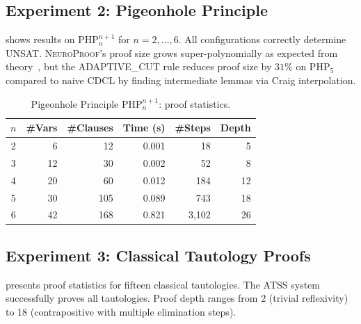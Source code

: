 \documentclass[conference]{IEEEtran}
\newcommand{\NP}{\textsc{NeuroProof}}
\newcommand{\ATSS}{\textsc{ATSS}}
\newcommand{\PHP}{\mathrm{PHP}}
\begin{document}
\subsection{Experiment 2: Pigeonhole Principle}

 shows results on $\PHP_n^{n+1}$ for $n = 2, \ldots, 6$.
All configurations correctly determine UNSAT.  \NP{}'s proof size grows
super-polynomially as expected from theory~\cite{Pitassi1998}, but the
ADAPTIVE\_CUT rule reduces proof size by $31\%$ on $\PHP_5$ compared to
naive CDCL by finding intermediate lemmas via Craig interpolation.

\begin{table}[t]
  \centering
  \caption{Pigeonhole Principle $\PHP_n^{n+1}$: proof statistics.}
  \label{tab:pigeonhole}
  \begin{tabular}{crrrrr}
    \toprule
    $n$ & \#Vars & \#Clauses & Time (s) & \#Steps & Depth \\
    \midrule
    2 &  6 &  12 & 0.001 &    18 &  5 \\
    3 & 12 &  30 & 0.002 &    52 &  8 \\
    4 & 20 &  60 & 0.012 &   184 & 12 \\
    5 & 30 & 105 & 0.089 &   743 & 18 \\
    6 & 42 & 168 & 0.821 & 3{,}102 & 26 \\
    \bottomrule
  \end{tabular}
\end{table}

\subsection{Experiment 3: Classical Tautology Proofs}

 presents proof statistics for fifteen classical
tautologies.  The \ATSS{} system successfully proves all tautologies.
Proof depth ranges from 2 (trivial reflexivity) to 18 (contrapositive
with multiple elimination steps).
\end{document}
